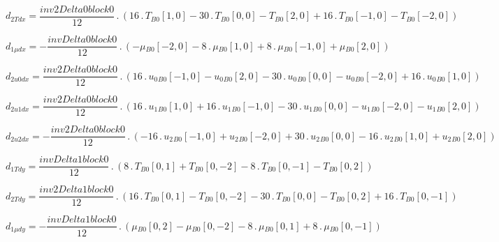 \documentclass{article}
\begin{document}
\begin{dmath}d_{2 T dx} = \frac{inv2Delta0block0}{12} \,.\, \left(16 \,.\, {T{_{B0}}}[{1,0}] - 30 \,.\, {T{_{B0}}}[{0,0}] - {T{_{B0}}}[{2,0}] + 16 \,.\, {T{_{B0}}}[{-1,0}] - {T{_{B0}}}[{-2,0}]\right)\end{dmath}

\begin{dmath}d_{1 \mu dx} = - \frac{invDelta0block0}{12} \,.\, \left(- {\mu{_{B0}}}[{-2,0}] - 8 \,.\, {\mu{_{B0}}}[{1,0}] + 8 \,.\, {\mu{_{B0}}}[{-1,0}] + {\mu{_{B0}}}[{2,0}]\right)\end{dmath}

\begin{dmath}d_{2 u0 dx} = \frac{inv2Delta0block0}{12} \,.\, \left(16 \,.\, {u_{0}{_{B0}}}[{-1,0}] - {u_{0}{_{B0}}}[{2,0}] - 30 \,.\, {u_{0}{_{B0}}}[{0,0}] - {u_{0}{_{B0}}}[{-2,0}] + 16 \,.\, {u_{0}{_{B0}}}[{1,0}]\right)\end{dmath}

\begin{dmath}d_{2 u1 dx} = \frac{inv2Delta0block0}{12} \,.\, \left(16 \,.\, {u_{1}{_{B0}}}[{1,0}] + 16 \,.\, {u_{1}{_{B0}}}[{-1,0}] - 30 \,.\, {u_{1}{_{B0}}}[{0,0}] - {u_{1}{_{B0}}}[{-2,0}] - {u_{1}{_{B0}}}[{2,0}]\right)\end{dmath}

\begin{dmath}d_{2 u2 dx} = - \frac{inv2Delta0block0}{12} \,.\, \left(- 16 \,.\, {u_{2}{_{B0}}}[{-1,0}] + {u_{2}{_{B0}}}[{-2,0}] + 30 \,.\, {u_{2}{_{B0}}}[{0,0}] - 16 \,.\, {u_{2}{_{B0}}}[{1,0}] + {u_{2}{_{B0}}}[{2,0}]\right)\end{dmath}

\begin{dmath}d_{1 T dy} = \frac{invDelta1block0}{12} \,.\, \left(8 \,.\, {T{_{B0}}}[{0,1}] + {T{_{B0}}}[{0,-2}] - 8 \,.\, {T{_{B0}}}[{0,-1}] - {T{_{B0}}}[{0,2}]\right)\end{dmath}

\begin{dmath}d_{2 T dy} = \frac{inv2Delta1block0}{12} \,.\, \left(16 \,.\, {T{_{B0}}}[{0,1}] - {T{_{B0}}}[{0,-2}] - 30 \,.\, {T{_{B0}}}[{0,0}] - {T{_{B0}}}[{0,2}] + 16 \,.\, {T{_{B0}}}[{0,-1}]\right)\end{dmath}

\begin{dmath}d_{1 \mu dy} = - \frac{invDelta1block0}{12} \,.\, \left({\mu{_{B0}}}[{0,2}] - {\mu{_{B0}}}[{0,-2}] - 8 \,.\, {\mu{_{B0}}}[{0,1}] + 8 \,.\, {\mu{_{B0}}}[{0,-1}]\right)\end{dmath}
\end{document}
